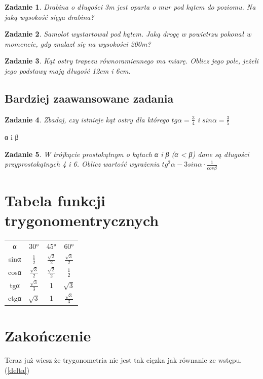 \documentclass[12pt,a4paper]{article}
\newtheorem{zad}{Zadanie}[section]
\begin{document}
\begin{zad}
Drabina o długości 3m jest oparta o mur pod kątem  do poziomu. Na jaką wysokość sięga drabina?
\end{zad}

\begin{zad}
Samolot wystartował pod kątem. Jaką drogę w powietrzu pokonał w momencie, gdy znalazł się na wysokości 200m?
\end{zad}

\begin{zad}
Kąt ostry trapezu równoramiennego ma miarę. Oblicz jego pole, jeżeli jego podstawy mają długość 12cm i 6cm.
\end{zad}

\subsection{Bardziej zaawansowane zadania}


\begin{zad}
Zbadaj, czy istnieje kąt ostry dla którego $tgα=\frac{3}{4}$ i $sinα=\frac{3}{5}$
\end{zad}
α i β
\begin{zad}
W trójkącie prostokątnym o kątach α i β (α < β) dane są długości przyprostokątnych 4 i 6. Oblicz wartość wyrażenia $tg^{2}α-3sinα·\frac{1}{cosβ}$
\end{zad}

\section{Tabela funkcji trygonomentrycznych}

\begin{tabular}{|c|c|c|c|} \hline
α & 30° & 45° & 60° \\
sinα & $\frac{1}{2}$ & $\frac{\sqrt{2}}{2}$ &   $\frac{\sqrt{3}}{2}$ \\
cosα & $\frac{\sqrt{3}}{2}$ & $\frac{\sqrt{2}}{2}$ & $\frac{1}{2}$\\
tgα &   $\frac{\sqrt{3}}{3}$& 1  &  $\sqrt{3}$\\
ctgα & $\sqrt{3}$ & 1 & $\frac{\sqrt{3}}{3}$\\
\hline \hline
\end{tabular}

\newpage

\section{Zakończenie}
Teraz już wiesz że trygonometria nie jest tak cięzka jak równanie ze wstępu. (\ref{delta})
\end{document}

